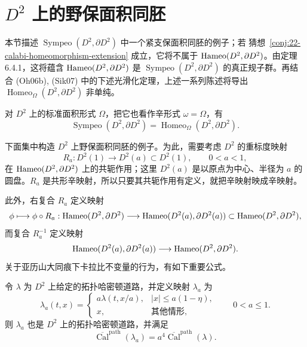 \section{\texorpdfstring{$D^2$}{D2} 上的野保面积同胚}

本节描述 $\operatorname{Sympeo}(D^2,\partial D^2)$ 中一个紧支保面积同胚的例子；若
猜想~\ref{conj:22-calabi-homeomorphism-extension} 成立，它将不属于
$\operatorname{Hameo}(D^2,\partial D^2)$。由定理 6.4.1，这将蕴含
$\operatorname{Hameo}(D^2,\partial D^2)$ 是
$\operatorname{Sympeo}(D^2,\partial D^2)$ 的真正规子群。再结合 (Oh06b), (Sik07)
中的下述光滑化定理，上述一系列陈述将导出
$\operatorname{Homeo}_\Omega(D^2,\partial D^2)$ 非单纯。

\begin{theorem}
\label{thm:22-area-preserving-smoothing}
对 $D^2$ 上的标准面积形式 $\Omega$，把它也看作辛形式 $\omega=\Omega$，有
\[
 \operatorname{Sympeo}(D^2,\partial D^2)
 =\operatorname{Homeo}_\Omega(D^2,\partial D^2).
\]
\end{theorem}

下面集中构造 $D^2$ 上野保面积同胚的例子。为此，需要考虑 $D^2$ 的重标度映射
\[
 R_a:D^2(1)\longrightarrow D^2(a)\subset D^2(1),
 \qquad 0<a<1,
\]
在 $\operatorname{Hameo}(D^2,\partial D^2)$ 上的共轭作用；这里 $D^2(a)$ 是以原点为中心、半径为
$a$ 的圆盘。$R_a$ 是共形辛映射，所以只要其共轭作用有定义，就把辛映射映成辛映射。

此外，右复合 $R_a$ 定义映射
\[
 \phi\longmapsto\phi\circ R_a:\operatorname{Hameo}(D^2,\partial D^2)
 \longrightarrow\operatorname{Hameo}(D^2(a),\partial D^2(a))
 \subset\operatorname{Hameo}(D^2,\partial D^2),
\]
而复合 $R_a^{-1}$ 定义映射
\[
 \operatorname{Hameo}(D^2(a),\partial D^2(a))
 \longrightarrow\operatorname{Hameo}(D^2,\partial D^2).
\]
关于亚历山大同痕下卡拉比不变量的行为，有如下重要公式。

\begin{lemma}
\label{lem:22-calabi-rescaling}
令 $\lambda$ 为 $D^2$ 上给定的拓扑哈密顿道路，并定义映射 $\lambda_a$ 为
\[
 \lambda_a(t,x)=
 \begin{cases}
  a\lambda(t,x/a),&|x|\leq a(1-\eta),\\
  x,&\text{其他情形},
 \end{cases}
 \qquad 0<a\leq1.
\]
则 $\lambda_a$ 也是 $D^2$ 上的拓扑哈密顿道路，并满足
\begin{equation}
 \overline{\operatorname{Cal}}^{\mathrm{path}}(\lambda_a)
 =a^4\overline{\operatorname{Cal}}^{\mathrm{path}}(\lambda).
 \label{eq:22-calabi-rescaling}
\end{equation}
\end{lemma}

